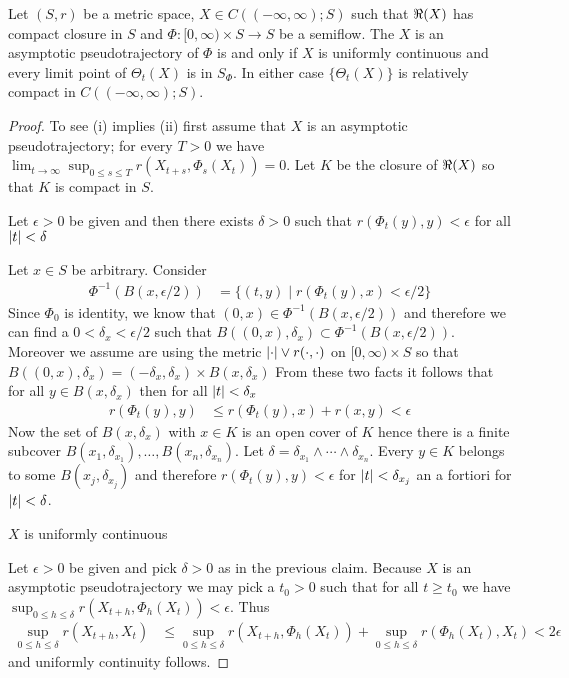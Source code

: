 \begin{thm}\label{AsymptoticPseudotrajectoryTranslationLimitPointCharacterization}Let $(S,r)$ be a metric space, $X \in C((-\infty, \infty); S)$ such that $\Re(X)$ has compact closure in $S$ and $\Phi : [0,\infty) \times S \to S$ be a semiflow.  The $X$ is an asymptotic pseudotrajectory of $\Phi$ is and only if $X$ is uniformly continuous and every limit point of $\Theta_t(X)$ is in $S_\Phi$.  In either case $\lbrace \Theta_t(X) \rbrace$ is relatively compact in $C((-\infty, \infty); S)$.  
\end{thm}
\begin{proof}
To see (i) implies (ii) first assume that $X$ is an asymptotic pseudotrajectory; for every $T>0$ we have $\lim_{t \to \infty} \sup_{0 \leq s \leq T} r(X_{t+s}, \Phi_s(X_t)) =0$.  Let $K$ be the closure of $\Re(X)$ so that $K$ is compact in $S$.  
\begin{clm}Let $\epsilon > 0$ be given and then there exists $\delta>0$ such that $r(\Phi_t(y), y)<\epsilon$ for all $\left \vert t \right \vert < \delta$
\end{clm}
Let $x \in S$ be arbitrary.  Consider 
\begin{align*}
\Phi^{-1}( B(x, \epsilon/2)) &= \lbrace (t,y) \mid r(\Phi_t(y), x) < \epsilon/2 \rbrace
\end{align*}
Since $\Phi_0$ is identity, we know that $(0,x) \in \Phi^{-1}( B(x, \epsilon/2)) $ and therefore we can find a $0 < \delta_x < \epsilon/2$ such that $B((0,x), \delta_x) \subset \Phi^{-1}( B(x, \epsilon/2))$.  Moreover we assume are using the metric $\left \vert \cdot \right \vert \vee r(\cdot, \cdot)$ on $[0,\infty) \times S$ so that  $B((0,x), \delta_x) = (-\delta_x, \delta_x) \times B(x,\delta_x)$ From these two facts it follows that for all $y \in B(x, \delta_x)$ then for all $\left \vert t \right \vert < \delta_x$
\begin{align*}
r(\Phi_t(y), y) &\leq r(\Phi_t(y), x) + r(x,y) < \epsilon
\end{align*}
Now the set of $B(x, \delta_x)$ with $x \in K$ is an open cover of $K$ hence there is a finite subcover $B(x_1, \delta_{x_1}), \dotsc, B(x_n, \delta_{x_n})$.  Let $\delta = \delta_{x_1} \wedge \dotsb \wedge \delta_{x_n}$.  Every $y \in K$ belongs to some $B(x_j, \delta_{x_j})$ and therefore $r(\Phi_t(y), y) < \epsilon$ for $\left \vert t \right \vert < \delta_{x_j}$ an a fortiori for $\left \vert t \right \vert < \delta$.

\begin{clm}$X$ is uniformly continuous
\end{clm}
Let $\epsilon>0$ be given and pick $\delta>0$ as in the previous claim.  Because $X$ is an asymptotic pseudotrajectory we may pick a $t_0>0$ such that for all $t \geq t_0$ we have $\sup_{0 \leq h \leq \delta} r(X_{t+h}, \Phi_h(X_t)) < \epsilon$.  Thus
\begin{align*}
\sup_{0 \leq h \leq \delta} r(X_{t+h}, X_t) &\leq \sup_{0 \leq h \leq \delta} r(X_{t+h}, \Phi_h(X_t)) + \sup_{0 \leq h \leq \delta} r(\Phi_h(X_t), X_t) < 2\epsilon
\end{align*}
and uniformly continuity follows. 


\end{proof}
